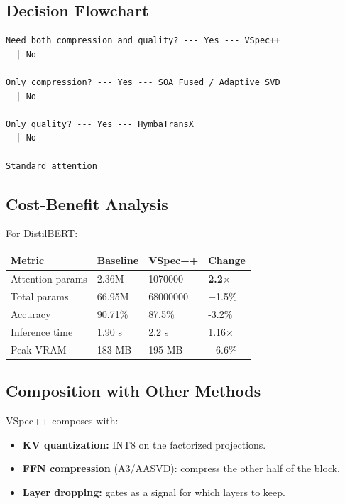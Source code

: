 \subsection{Decision Flowchart}

\begin{lstlisting}
Need both compression and quality? --- Yes --- VSpec++
  | No
   
Only compression? --- Yes --- SOA Fused / Adaptive SVD
  | No
   
Only quality? --- Yes --- HymbaTransX
  | No
   
Standard attention
\end{lstlisting}

\subsection{Cost-Benefit Analysis}

For DistilBERT:

\begin{table}[H]
\centering
\small
\begin{tabular}{llll}
\toprule
\textbf{Metric} & \textbf{Baseline} & \textbf{VSpec++} & \textbf{Change} \\
\midrule
Attention params & 2.36M & 1070000 & \textbf{2.2$\times$} \\
Total params & 66.95M & 68000000 & +1.5\% \\
Accuracy & 90.71\% & 87.5\% & -3.2\% \\
Inference time & 1.90 s & 2.2 s & 1.16$\times$ \\
Peak VRAM & 183 MB & 195 MB & +6.6\% \\
\bottomrule
\end{tabular}
\end{table}

\subsection{Composition with Other Methods}

VSpec++ composes with:

\begin{itemize}
\item \textbf{KV quantization:} INT8 on the factorized projections.
\item \textbf{FFN compression} (A3/AASVD): compress the other half of the block.
\item \textbf{Layer dropping:} gates as a signal for which layers to keep.

\end{itemize}
